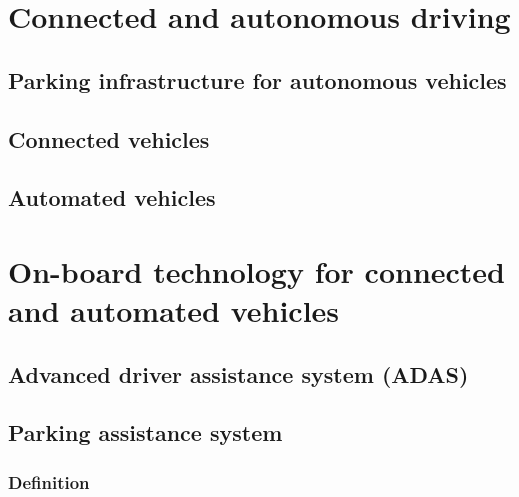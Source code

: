 \documentclass[
]{book}
\begin{document}
\hypertarget{connected}{%
\chapter{Connected and autonomous driving}\label{connected}}

\hypertarget{parking_av}{%
\section{Parking infrastructure for autonomous vehicles}\label{parking_av}}

\hypertarget{connected_veh}{%
\section{Connected vehicles}\label{connected_veh}}

\hypertarget{av}{%
\section{Automated vehicles}\label{av}}

\hypertarget{onboard}{%
\chapter{On-board technology for connected and automated vehicles}\label{onboard}}

\hypertarget{adas}{%
\section{Advanced driver assistance system (ADAS)}\label{adas}}

\hypertarget{parking_assistance}{%
\section{Parking assistance system}\label{parking_assistance}}

\hypertarget{definition-16}{%
\subsection*{Definition}\label{definition-16}}
\end{document}
